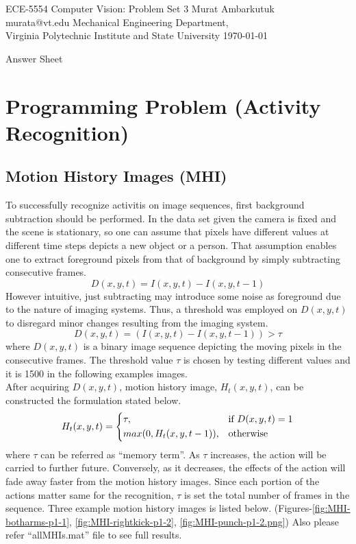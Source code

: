 \documentclass{article}
\begin{document}
\label{Cover}
	\begin{center}
	\large{ECE-5554 Computer Vision: Problem Set 3} 
	\vfill
	Murat Ambarkutuk \\ murata@vt.edu
	\vfill
	Mechanical Engineering Department,\\ Virginia Polytechnic Institute and State University
	\vfill
	\today
	\end{center}
\pagebreak 
\large{Answer Sheet}
\label{Short Answer}

\label{Programming Problem (Activity Recognition)}
\section{Programming Problem (Activity Recognition)}
\subsection{Motion History Images (MHI)}
To successfully recognize activitis on image sequences, first background
subtraction should be performed.
In the data set given the camera is fixed and the scene is stationary, so one
can assume that pixels have different values at different time steps depicts a
new object or a person. That assumption enables one to extract foreground pixels
from that of background by simply subtracting consecutive frames. 
$$D(x,y,t) = I(x,y,t) - I(x,y,t-1)$$
However intuitive, just subtracting may introduce some noise as foreground due
to the nature of imaging systems. Thus, a threshold was employed on $D(x,y,t)$
to disregard minor changes resulting from the imaging system. 
$$D(x,y,t) = (I(x,y,t)-I(x,y,t-1))> \tau$$
where $D(x,y,t)$ is a binary image sequence depicting the moving pixels in the
consecutive frames. The threshold value $\tau$ is chosen by testing different
values and it is 1500 in the following examples images. \\
After acquiring $D(x,y,t)$, motion history image, $H_t(x,y,t)$, can be
constructed the formulation stated below. 
$$H_t(x,y,t) =
\begin{dcases}
    \tau, & \text{if } D(x,y,t)=1\\
    max(0,H_t(x,y,t-1)),              & \text{otherwise}
\end{dcases}
$$
where $\tau$ can be referred as ``memory term''. As $\tau$ increases, the action
will be carried to further future. Conversely, as it decreases, the effects of
the action will fade away faster from the motion history images. Since each 
portion of the actions matter same for the recognition, $\tau$ is set the total
number of frames in the sequence. Three example motion history images is listed
below. (Figures-\ref{fig:MHI-botharms-p1-1}, \ref{fig:MHI-rightkick-p1-2},
\ref{fig:MHI-punch-p1-2.png}) Also please refer ``allMHIs.mat'' file to see
full results.
\end{document}
